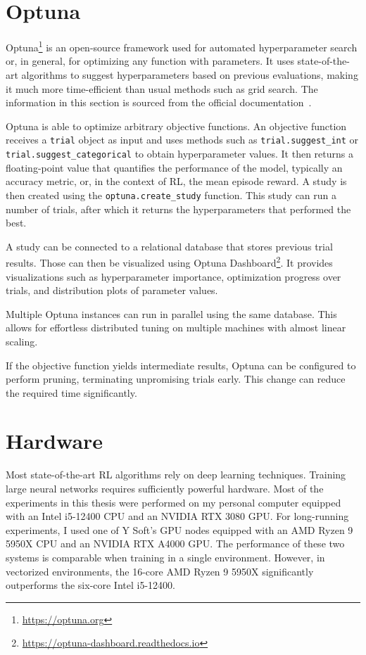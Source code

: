 \documentclass[
  digital,     %
  oneside,     %
  nosansbold,  %
  nocolorbold, %
  lof,         %
  lot,         %
]{fithesis4}
\begin{document}
\section{Optuna}
\label{sec:optuna}

Optuna\footnote{\url{https://optuna.org}} is an open-source framework used for automated hyperparameter search or, in general, for optimizing any function with parameters. It uses state-of-the-art algorithms to suggest hyperparameters based on previous evaluations, making it much more time-efficient than usual methods such as grid search. The information in this section is sourced from the official documentation~\cite{optuna-docs}.

Optuna is able to optimize arbitrary objective functions. An objective function receives a \texttt{trial} object as input and uses methods such as \texttt{trial.suggest\_int} or \texttt{trial.suggest\_categorical} to obtain hyperparameter values. It then returns a floating-point value that quantifies the performance of the model, typically an accuracy metric, or, in the context of RL, the mean episode reward. A study is then created using the \texttt{optuna.create\_study} function. This study can run a number of trials, after which it returns the hyperparameters that performed the best.

A study can be connected to a relational database that stores previous trial results. Those can then be visualized using Optuna Dashboard\footnote{\url{https://optuna-dashboard.readthedocs.io}}. It provides visualizations such as hyperparameter importance, optimization progress over trials, and distribution plots of parameter values.

Multiple Optuna instances can run in parallel using the same database. This allows for effortless distributed tuning on multiple machines with almost linear scaling.

If the objective function yields intermediate results, Optuna can be configured to perform pruning, terminating unpromising trials early. This change can reduce the required time significantly.

\section{Hardware}

Most state-of-the-art RL algorithms rely on deep learning techniques. Training large neural networks requires sufficiently powerful hardware. Most of the experiments in this thesis were performed on my personal computer equipped with an Intel i5-12400 CPU and an NVIDIA RTX 3080 GPU. For long-running experiments, I used one of Y Soft's GPU nodes equipped with an AMD Ryzen 9 5950X CPU and an NVIDIA RTX A4000 GPU. The performance of these two systems is comparable when training in a single environment. However, in vectorized environments, the 16-core AMD Ryzen 9 5950X significantly outperforms the six-core Intel i5-12400.
\end{document}
